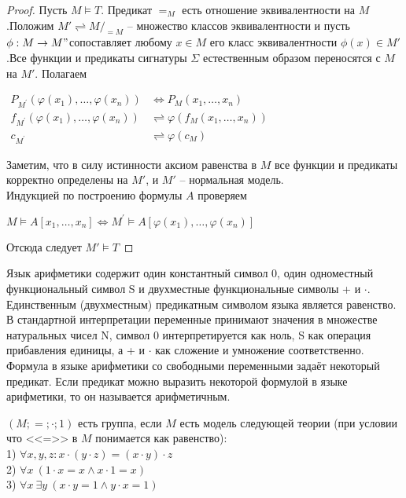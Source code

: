 \begin{proof}
    Пусть $M \vDash T$. Предикат $=_M$ есть отношение эквивалентности на $M$.Положим $M'\rightleftharpoons M/_{=M}$ -- множество классов эквивалентности и пусть $\phi :M\rightarrow M"$сопоставляет любому $x\in M$ его класс эквивалентности $\phi(x)\in M'$.Все функции и предикаты сигнатуры $\Sigma$ естественным образом переносятся с $M$ на $M'$. Полагаем
    \begin{center}
    $\begin{aligned}
    P_{M^{\prime}}\left(\varphi\left(x_{1}\right), \ldots, \varphi\left(x_{n}\right)\right) & \Longleftrightarrow P_{M}\left(x_{1}, \ldots, x_{n}\right) \\
    f_{M^{\prime}}\left(\varphi\left(x_{1}\right), \ldots, \varphi\left(x_{n}\right)\right) & \rightleftharpoons \varphi\left(f_{M}\left(x_{1}, \ldots, x_{n}\right)\right) \\
    c_{M^{\prime}} & \rightleftharpoons \varphi\left(c_{M}\right)
    \end{aligned}$
    \end{center}
    Заметим, что в силу истинности аксиом равенства в $M$ все функции и предикаты корректно определены на $M'$, и $M'$ -- нормальная модель.\\
    Индукцией по построению формулы $A$ проверяем
    \begin{center}
        $M \vDash A\left[x_{1}, \ldots, x_{n}\right] \Longleftrightarrow M^{\prime} \vDash A\left[\varphi\left(x_{1}\right), \ldots, \varphi\left(x_{n}\right)\right]$
    \end{center}
    Отсюда следует $M'\vDash T$
\end{proof}
\begin{example}
Язык арифметики содержит один константный символ 0, один одноместный функциональный символ S и двухместные функциональные символы + и $\cdot$. Единственным (двухместным) предикатным символом языка является равенство. В стандартной интерпретации переменные принимают значения в множестве натуральных чисел N, символ 0 интерпретируется как ноль, S как операция прибавления единицы, а + и $\cdot$ как сложение и умножение соответственно. Формула в языке арифметики со свободными переменными задаёт некоторый предикат. Если предикат можно выразить некоторой формулой в языке арифметики, то он называется арифметичным. 
\end{example}
\begin{example}
    $(M;=;\cdot;1)$ есть группа, если $M$ есть модель следующей теории (при условии что <<=>> в $M$ понимается как равенство):\\
    1) $\forall x,y,z: x\cdot(y\cdot z)=(x\cdot y)\cdot z$\\
    2) $\forall x \ (1 \cdot x=x \wedge x \cdot 1=x)$\\
    3) $\forall x \ \exists y \ (x \cdot y=1 \wedge y \cdot x=1)$\\
\end{example}